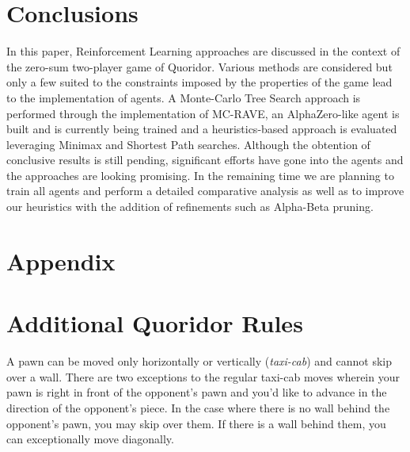 \documentclass[journal, a4paper]{IEEEtran}
\begin{document}
\section{Conclusions}
\label{sec:conclusion}
In this paper, Reinforcement Learning approaches are discussed in the context of the zero-sum two-player game of Quoridor. Various methods are considered but only a few suited to the constraints imposed by the properties of the game lead to the implementation of agents. A Monte-Carlo Tree Search approach is performed through the implementation of MC-RAVE, an AlphaZero-like agent is built and is currently being trained and a heuristics-based approach is evaluated leveraging Minimax and Shortest Path searches. Although the obtention of conclusive results is still pending, significant efforts have gone into the agents and the approaches are looking promising. In the remaining time we are planning to train all agents and perform a detailed comparative analysis as well as to improve our heuristics with the addition of refinements such as Alpha-Beta pruning.

\newpage
\section{Appendix}\label{sec:appendix}

\section*{Additional Quoridor Rules}\label{sec:quoridor-details}
A pawn can be moved only horizontally or vertically (\textit{taxi-cab}) and cannot skip over a wall. 
There are two exceptions to the regular taxi-cab moves wherein your pawn is right in front of the opponent's pawn and you'd like to advance in the direction of the opponent's piece. In the case where there is no wall behind the opponent's pawn, you may skip over them. If there is a wall behind them, you can exceptionally move diagonally.
\end{document}
